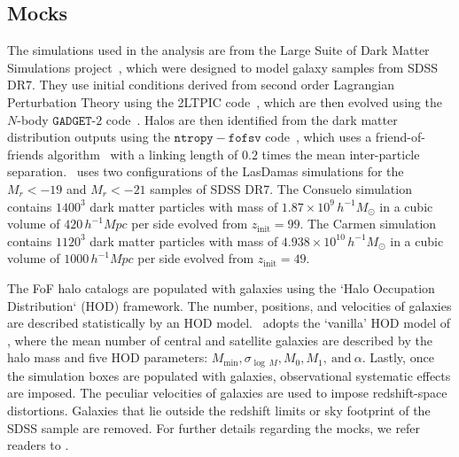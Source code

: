 \documentclass[12pt, letterpaper, preprint]{aastex}
\newcommand{\Sinh}{\citetalias{sinha2017}}
\begin{document}
\subsection{\cite{sinha2017} Mocks} \label{sec:gmf} 
The simulations used in the \cite{sinha2017} analysis are from the
Large Suite of Dark Matter Simulations project~\citep[LasDamas;][]{mcbride2009}, 
which were designed to model galaxy samples from SDSS DR7. They use 
initial conditions derived from second order Lagrangian Perturbation 
Theory using the 2LTPIC code~\citep{scoccimarro1998, crocce2006}, 
which are then evolved using the $N$-body $\mathtt{GADGET}$-$2$ code~\citep{springel2005}.
Halos are then identified from the dark matter distribution outputs using 
the $\mathtt{ntropy-fofsv}$ code~\citep{gardner2007}, which uses a 
friend-of-friends algorithm~\citep[FoF;][]{davis1985} with a linking length of $0.2$
times the mean inter-particle separation. %
\Sinh~uses two configurations of the LasDamas simulations for the 
$M_r < -19$ and $M_r < -21$ samples of SDSS DR7.
The Consuelo simulation contains $1400^3$ dark matter particles with 
mass of $1.87 \times 10^9\,h^{-1} M_\odot$ in a cubic volume of 
$420\,h^{-1} Mpc$ per side evolved from $z_\mathrm{init} = 99$. 
The Carmen simulation contains $1120^3$ dark matter particles with mass 
of $4.938 \times 10^{10}\,h^{-1} M_\odot$ in a cubic volume of 
$1000\,h^{-1} Mpc$ per side evolved from $z_\mathrm{init} = 49$. 

The FoF halo catalogs are populated with galaxies using the 
`Halo Occupation Distribution` (HOD) framework. The 
number, positions, and velocities of galaxies are described statistically 
by an HOD model. \Sinh~adopts the `vanilla' HOD model of \cite{zheng2007}, 
where the mean number of central and satellite galaxies are described by 
the halo mass and five HOD parameters: $M_\mathrm{min}, 
\sigma_{\log\,M} , M_0, M_1,~\mathrm{and}~\alpha$. Lastly, once the 
simulation boxes are populated with galaxies, observational systematic 
effects are imposed. The peculiar velocities of galaxies are used to 
impose redshift-space distortions. Galaxies that lie outside the redshift
limits or sky footprint of the SDSS sample are removed. For further 
details regarding the mocks, we refer readers to \Sinh.
\end{document}
